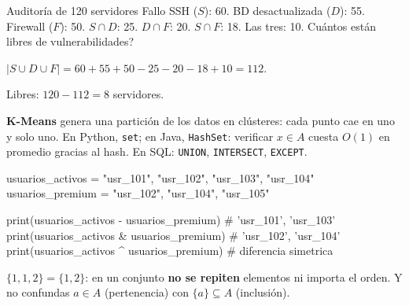 \begin{tmejemplo}{Auditor\'ia de 120 servidores}
Fallo SSH ($S$): 60. BD desactualizada ($D$): 55. Firewall ($F$): 50. $S\cap D$: 25. $D\cap F$: 20. $S\cap F$: 18. Las tres: 10. \textquestiondown Cu\'antos est\'an libres de vulnerabilidades?
\begin{tmpasos}
\item $|S\cup D\cup F|=60+55+50-25-20-18+10=112$.
\item Libres: $120-112=8$ servidores.
\end{tmpasos}
\end{tmejemplo}

\begin{tmsistemas}
\textbf{K-Means} genera una partici\'on de los datos en cl\'usteres: cada punto cae en uno y solo uno. En Python, \texttt{set}; en Java, \texttt{HashSet}: verificar $x\in A$ cuesta $O(1)$ en promedio gracias al hash. En SQL: \texttt{UNION}, \texttt{INTERSECT}, \texttt{EXCEPT}.
\end{tmsistemas}

\begin{tmcodigo}
usuarios_activos = {"usr_101", "usr_102", "usr_103", "usr_104"}
usuarios_premium = {"usr_102", "usr_104", "usr_105"}

print(usuarios_activos - usuarios_premium)   # {'usr_101', 'usr_103'}
print(usuarios_activos & usuarios_premium)   # {'usr_102', 'usr_104'}
print(usuarios_activos ^ usuarios_premium)   # diferencia simetrica
\end{tmcodigo}

\begin{tmcuidado}$\{1, 1, 2\}=\{1, 2\}$: en un conjunto \textbf{no se repiten} elementos ni importa el orden. Y no confundas $a\in A$ (pertenencia) con $\{a\}\subseteq A$ (inclusi\'on).\end{tmcuidado}

